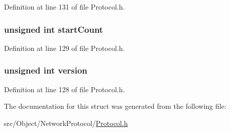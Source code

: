 Definition at line 131 of file Protocol.h.

\hypertarget{struct_block_spck_a8063bd9a895b61caa30d0ca876a6e300}{
\subsubsection[{startCount}]{\setlength{\rightskip}{0pt plus 5cm}unsigned int {\bf startCount}}}
\label{struct_block_spck_a8063bd9a895b61caa30d0ca876a6e300}


Definition at line 129 of file Protocol.h.

\hypertarget{struct_block_spck_a5408ac5df4c170828874e1b10b4c35a0}{
\subsubsection[{version}]{\setlength{\rightskip}{0pt plus 5cm}unsigned int {\bf version}}}
\label{struct_block_spck_a5408ac5df4c170828874e1b10b4c35a0}


Definition at line 128 of file Protocol.h.



The documentation for this struct was generated from the following file:\begin{DoxyCompactItemize}
\item 
src/Object/NetworkProtocol/\hyperlink{_protocol_8h}{Protocol.h}\end{DoxyCompactItemize}
